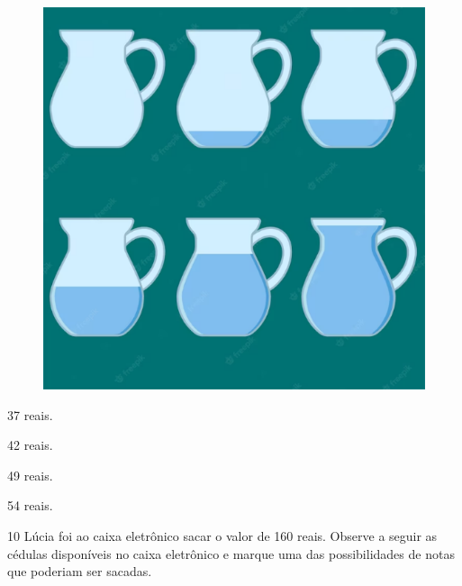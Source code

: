 \begin{figure}[htpb!]
\includegraphics[width=\textwidth]{./media/image145.png}
\end{figure}

\begin{minipage}{.5\textwidth}
\begin{escolha}
\item 37 reais.

\item 42 reais.

\item 49 reais.

\item 54 reais.
\end{escolha}
\end{minipage}

\num{10} Lúcia foi ao caixa eletrônico sacar o valor de 160 reais. Observe a seguir
as cédulas disponíveis no caixa eletrônico e marque uma das
possibilidades de notas que poderiam ser sacadas.

